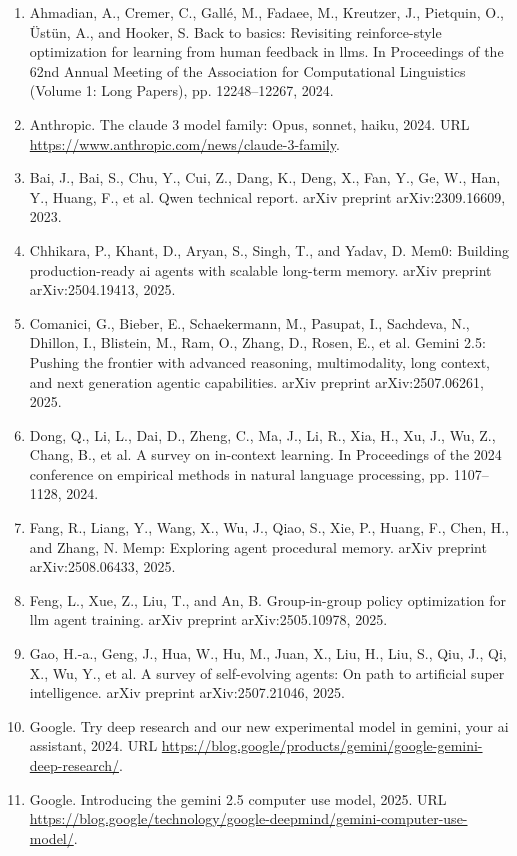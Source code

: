 \documentclass[11pt,UTF8,fontset=fandol]{ctexart}
\begin{document}
\begin{enumerate}[leftmargin=2em,itemsep=0.15em]
\item Ahmadian, A., Cremer, C., Gallé, M., Fadaee, M., Kreutzer, J., Pietquin, O., Üstün, A., and Hooker, S. Back to basics: Revisiting reinforce-style optimization for learning from human feedback in llms. In Proceedings of the 62nd Annual Meeting of the Association for Computational Linguistics (Volume 1: Long Papers), pp. 12248--12267, 2024.
\item Anthropic. The claude 3 model family: Opus, sonnet, haiku, 2024. URL \url{https://www.anthropic.com/news/claude-3-family}.
\item Bai, J., Bai, S., Chu, Y., Cui, Z., Dang, K., Deng, X., Fan, Y., Ge, W., Han, Y., Huang, F., et al. Qwen technical report. arXiv preprint arXiv:2309.16609, 2023.
\item Chhikara, P., Khant, D., Aryan, S., Singh, T., and Yadav, D. Mem0: Building production-ready ai agents with scalable long-term memory. arXiv preprint arXiv:2504.19413, 2025.
\item Comanici, G., Bieber, E., Schaekermann, M., Pasupat, I., Sachdeva, N., Dhillon, I., Blistein, M., Ram, O., Zhang, D., Rosen, E., et al. Gemini 2.5: Pushing the frontier with advanced reasoning, multimodality, long context, and next generation agentic capabilities. arXiv preprint arXiv:2507.06261, 2025.
\item Dong, Q., Li, L., Dai, D., Zheng, C., Ma, J., Li, R., Xia, H., Xu, J., Wu, Z., Chang, B., et al. A survey on in-context learning. In Proceedings of the 2024 conference on empirical methods in natural language processing, pp. 1107--1128, 2024.
\item Fang, R., Liang, Y., Wang, X., Wu, J., Qiao, S., Xie, P., Huang, F., Chen, H., and Zhang, N. Memp: Exploring agent procedural memory. arXiv preprint arXiv:2508.06433, 2025.
\item Feng, L., Xue, Z., Liu, T., and An, B. Group-in-group policy optimization for llm agent training. arXiv preprint arXiv:2505.10978, 2025.
\item Gao, H.-a., Geng, J., Hua, W., Hu, M., Juan, X., Liu, H., Liu, S., Qiu, J., Qi, X., Wu, Y., et al. A survey of self-evolving agents: On path to artificial super intelligence. arXiv preprint arXiv:2507.21046, 2025.
\item Google. Try deep research and our new experimental model in gemini, your ai assistant, 2024. URL \url{https://blog.google/products/gemini/google-gemini-deep-research/}.
\item Google. Introducing the gemini 2.5 computer use model, 2025. URL \url{https://blog.google/technology/google-deepmind/gemini-computer-use-model/}.

\end{enumerate}
\end{document}
